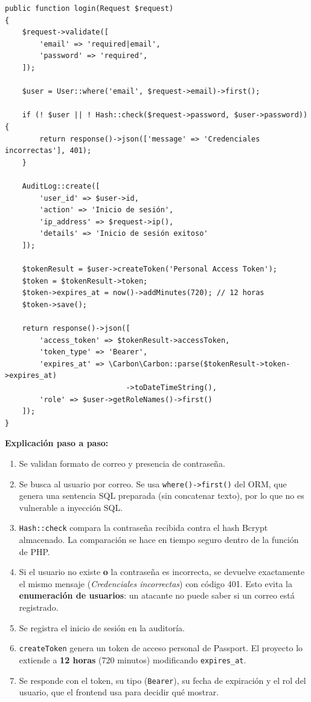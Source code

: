 \begin{lstlisting}[caption={AuthController::login}]
public function login(Request $request)
{
    $request->validate([
        'email' => 'required|email',
        'password' => 'required',
    ]);

    $user = User::where('email', $request->email)->first();

    if (! $user || ! Hash::check($request->password, $user->password)) {
        return response()->json(['message' => 'Credenciales incorrectas'], 401);
    }

    AuditLog::create([
        'user_id' => $user->id,
        'action' => 'Inicio de sesión',
        'ip_address' => $request->ip(),
        'details' => 'Inicio de sesión exitoso'
    ]);

    $tokenResult = $user->createToken('Personal Access Token');
    $token = $tokenResult->token;
    $token->expires_at = now()->addMinutes(720); // 12 horas
    $token->save();

    return response()->json([
        'access_token' => $tokenResult->accessToken,
        'token_type' => 'Bearer',
        'expires_at' => \Carbon\Carbon::parse($tokenResult->token->expires_at)
                            ->toDateTimeString(),
        'role' => $user->getRoleNames()->first()
    ]);
}
\end{lstlisting}

\textbf{Explicación paso a paso:}
\begin{enumerate}
    \item Se validan formato de correo y presencia de contraseña.
    \item Se busca al usuario por correo. Se usa \texttt{where()->first()} del ORM, que genera una sentencia SQL preparada (sin concatenar texto), por lo que no es vulnerable a inyección SQL.
    \item \texttt{Hash::check} compara la contraseña recibida contra el hash Bcrypt almacenado. La comparación se hace en tiempo seguro dentro de la función de PHP.
    \item Si el usuario no existe \textbf{o} la contraseña es incorrecta, se devuelve exactamente el mismo mensaje (\emph{Credenciales incorrectas}) con código 401. Esto evita la \textbf{enumeración de usuarios}: un atacante no puede saber si un correo está registrado.
    \item Se registra el inicio de sesión en la auditoría.
    \item \texttt{createToken} genera un token de acceso personal de Passport. El proyecto lo extiende a \textbf{12 horas} (720 minutos) modificando \texttt{expires\_at}.
    \item Se responde con el token, su tipo (\texttt{Bearer}), su fecha de expiración y el rol del usuario, que el frontend usa para decidir qué mostrar.
\end{enumerate}

